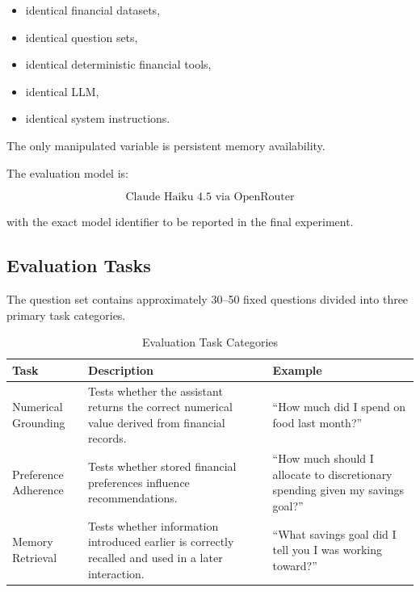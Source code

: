 \documentclass[conference]{IEEEtran}
\begin{document}
    \begin{itemize}
        \item identical financial datasets,
        \item identical question sets,
        \item identical deterministic financial tools,
        \item identical LLM,
        \item identical system instructions.
    \end{itemize}
    
    The only manipulated variable is persistent memory availability.
    
    The evaluation model is:
    
    \begin{equation}
    \text{Claude Haiku 4.5 via OpenRouter}
    \end{equation}
    
    with the exact model identifier to be reported in the final experiment.
    
    \subsection{Evaluation Tasks}
    
    The question set contains approximately 30--50 fixed questions divided
    into three primary task categories.
    
    \begin{table}[t]
    \centering
    \caption{Evaluation Task Categories}
    \label{tab:tasks}
    \begin{tabular}{p{}p{}p{}}
    \toprule
    \textbf{Task} & \textbf{Description} & \textbf{Example} \\
    \midrule
    
    Numerical Grounding &
    Tests whether the assistant returns the correct numerical value derived
    from financial records. &
    ``How much did I spend on food last month?'' \\
    
    Preference Adherence &
    Tests whether stored financial preferences influence recommendations. &
    ``How much should I allocate to discretionary spending given my savings
    goal?'' \\
    
    Memory Retrieval &
    Tests whether information introduced earlier is correctly recalled and
    used in a later interaction. &
    ``What savings goal did I tell you I was working toward?'' \\
    
    \bottomrule
    \end{tabular}
    \end{table}
    
\end{document}
